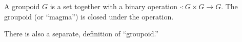 \documentclass[12pt]{article}
\begin{document}
A groupoid $G$ is a set together with a binary operation $\cdot : G \times G \longrightarrow G$.  The groupoid (or ``magma'') is closed under the operation.

There is also a separate,  definition of ``groupoid.''
\end{document}
